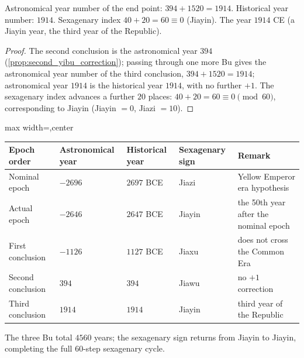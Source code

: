 \begin{proposition}\label{prop:third_yibu_ganzhi}
Astronomical year number of the end point: \(394+1520=1914\). Historical year number: \(1914\). Sexagenary index \(40+20=60\equiv 0\) (Jiayin). The year \(1914\) CE (a Jiayin year, the third year of the Republic).
\end{proposition}

\begin{proof}
The second conclusion is the astronomical year \(394\) (\cref{prop:second_yibu_correction}); passing through one more Bu gives the astronomical year number of the third conclusion, \(394+1520=1914\); astronomical year \(1914\) is the historical year \(1914\), with no further \(+1\). The sexagenary index advances a further \(20\) places: \(40+20=60\equiv 0\pmod{60}\), corresponding to Jiayin (Jiayin \(=0\), Jiazi \(=10\)).
\end{proof}

\begin{theorem}\label{thm:xuanyuan_complete_sequence}
\begin{center}
\setlength{\tabcolsep}{3pt}
\begin{adjustbox}{max width=\linewidth,center}
\begin{tabular}{>{\centering\arraybackslash}p{2.5cm}>{\centering\arraybackslash}p{2.5cm}>{\centering\arraybackslash}p{2.5cm}>{\centering\arraybackslash}p{2.5cm}>{\centering\arraybackslash}p{3cm}}
\toprule
Epoch order & Astro\-nomical year & Historical year & Sexagenary sign & Remark \\
\midrule
Nominal epoch & \(-2696\) & \(2697\) BCE & Jiazi & Yellow Emperor era hypothesis \\
Actual epoch & \(-2646\) & \(2647\) BCE & Jiayin & the 50th year after the nominal epoch \\
First conclusion & \(-1126\) & \(1127\) BCE & Jiaxu & does not cross the Common Era \\
Second conclusion & \(394\) & \(394\) & Jiawu & no \(+1\) correction \\
Third conclusion & \(1914\) & \(1914\) & Jiayin & third year of the Republic \\
\bottomrule
\end{tabular}
\end{adjustbox}
\end{center}
The three Bu total \(4560\) years; the sexagenary sign returns from Jiayin to Jiayin, completing the full \(60\)-step sexagenary cycle.
\end{theorem}


